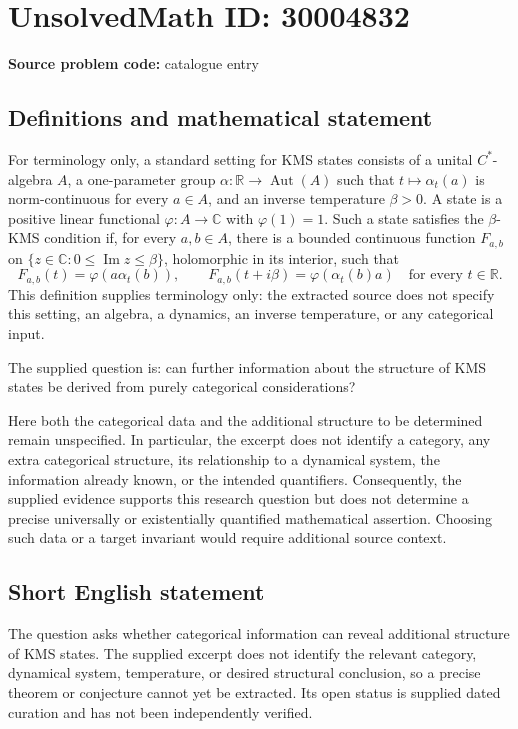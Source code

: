 \documentclass[11pt]{article}
\newcommand{\R}{\mathbb{R}}
\newcommand{\C}{\mathbb{C}}
\begin{document}
\section*{UnsolvedMath ID: 30004832}
\textbf{Source problem code:} catalogue entry
\subsection{Definitions and mathematical statement}
For terminology only, a standard setting for KMS states consists of a unital \(C^*\)-algebra \(A\), a one-parameter group \(\alpha:\R\to\operatorname{Aut}(A)\) such that \(t\mapsto\alpha_t(a)\) is norm-continuous for every \(a\in A\), and an inverse temperature \(\beta>0\). A state is a positive linear functional \(\varphi:A\to\C\) with \(\varphi(1)=1\). Such a state satisfies the \(\beta\)-KMS condition if, for every \(a,b\in A\), there is a bounded continuous function \(F_{a,b}\) on \(\{z\in\C:0\leq\operatorname{Im}z\leq\beta\}\), holomorphic in its interior, such that
\[
F_{a,b}(t)=\varphi(a\alpha_t(b)),\qquad
F_{a,b}(t+i\beta)=\varphi(\alpha_t(b)a)
\quad\text{for every }t\in\R.
\]
This definition supplies terminology only: the extracted source does not specify this setting, an algebra, a dynamics, an inverse temperature, or any categorical input.

The supplied question is: can further information about the structure of KMS states be derived from purely categorical considerations?

Here both the categorical data and the additional structure to be determined remain unspecified. In particular, the excerpt does not identify a category, any extra categorical structure, its relationship to a dynamical system, the information already known, or the intended quantifiers. Consequently, the supplied evidence supports this research question but does not determine a precise universally or existentially quantified mathematical assertion. Choosing such data or a target invariant would require additional source context.
\subsection{Short English statement}
The question asks whether categorical information can reveal additional structure of KMS states. The supplied excerpt does not identify the relevant category, dynamical system, temperature, or desired structural conclusion, so a precise theorem or conjecture cannot yet be extracted. Its open status is supplied dated curation and has not been independently verified.
\end{document}
